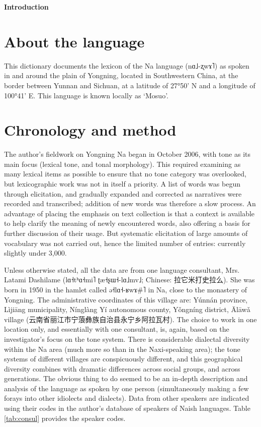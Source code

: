 \documentclass[oldfontcommands,oneside,a4paper,11pt]{article}
\newcommand{\ipa}[1]{{\phon #1}} %
\newcommand{\zh}[1]{{\cn #1}}
\begin{document}
 
	

	{\LARGE \textbf{Introduction}}
	\section{About the language} \label{sec:language}
	
	This dictionary documents the lexicon of the Na language (\ipa{nɑ˩-ʐwɤ˥}) as spoken in and around the plain of Yongning, located in Southwestern China, at the border between Yunnan and Sichuan, at a latitude of 27°50’ N and a longitude of 100°41’ E. This language is known locally as ‘Mosuo'. 
	
	\section{Chronology and method} \label{sec:method}
	
	The author's fieldwork on Yongning Na began in October 2006, with tone as its main focus (lexical tone, and tonal morphology). This required examining as many lexical items as possible to ensure that no tone category was overlooked, but lexicographic work was not in itself a priority. A list of words was begun through elicitation, and gradually expanded and corrected as narratives were recorded and transcribed; addition of new words was therefore a slow process. An advantage of placing the emphasis on text collection is that a context is available to help clarify the meaning of newly encountered words, also offering a basis for further discussion of their usage. But systematic elicitation of large amounts of vocabulary was not carried out, hence the limited number of entries: currently slightly under 3,000. 
	
	Unless otherwise stated, all the data are from one language consultant, Mrs. Latami Dashilame (\ipa{lɑ˧tʰɑ˧mi˥ ʈæ˧ʂɯ˧-lɑ˩mv˩}; Chinese: \zh{拉它米打史拉么}). She was born in 1950 in the hamlet called \ipa{ə˧lɑ˧-ʁwɤ\#˥} in Na, close to the monastery of Yongning. The administrative coordinates of this village are: Yúnnán province, Lìjiāng municipality, Nínglàng Yí autonomous county, Yǒngníng district, Ālāwǎ village (\zh{云南省丽江市宁蒗彝族自治县永宁乡阿拉瓦村}). The choice to work in one location only, and essentially with one consultant, is, again, based on the investigator's focus on the tone system. There is considerable dialectal diversity within the Na area (much more so than in the Naxi-speaking area); the tone systems of different villages are conspicuously different, and this geographical diversity combines with dramatic differences across social groups, and across generations. The obvious thing to do seemed to be an in-depth description and analysis of the language as spoken by one person (simultaneously making a few forays into other idiolects and dialects). Data from other speakers are indicated using their codes in the author's database of speakers of Naish languages. Table \ref{tab:consul} provides the speaker codes.
	
\end{document}
